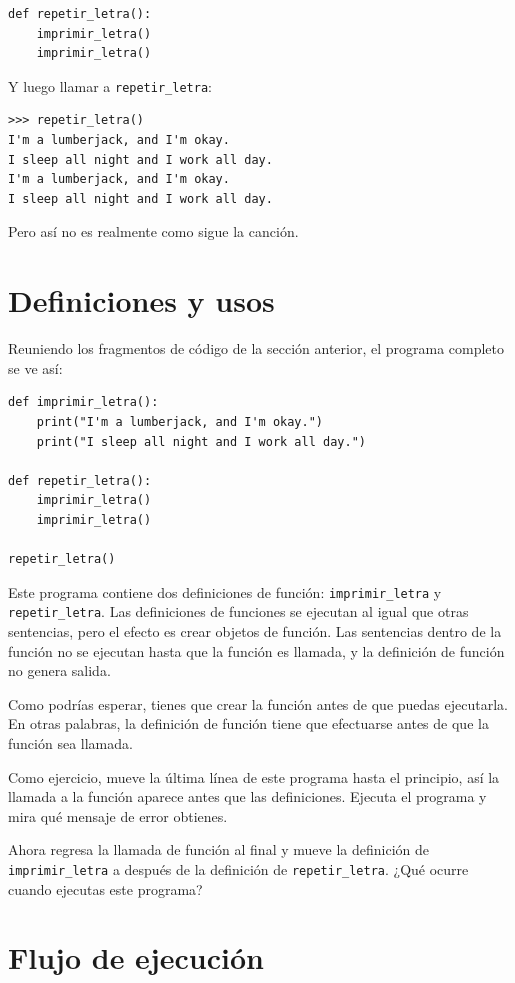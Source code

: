 \documentclass[10pt]{book}
\begin{document}
\begin{verbatim}
def repetir_letra():
    imprimir_letra()
    imprimir_letra()
\end{verbatim}
%
Y luego llamar a \verb"repetir_letra":

\begin{verbatim}
>>> repetir_letra()
I'm a lumberjack, and I'm okay.
I sleep all night and I work all day.
I'm a lumberjack, and I'm okay.
I sleep all night and I work all day.
\end{verbatim}
%
Pero así no es realmente como sigue la canción.


\section{Definiciones y usos}

Reuniendo los fragmentos de código de la sección anterior, el
programa completo se ve así:

\begin{verbatim}
def imprimir_letra():
    print("I'm a lumberjack, and I'm okay.")
    print("I sleep all night and I work all day.")

def repetir_letra():
    imprimir_letra()
    imprimir_letra()

repetir_letra()
\end{verbatim}
%
Este programa contiene dos definiciones de función: \verb"imprimir_letra" y
\verb"repetir_letra".  Las definiciones de funciones se ejecutan al igual que otras
sentencias, pero el efecto es crear objetos de función.  Las sentencias
dentro de la función no se ejecutan hasta que la función es llamada, y
la definición de función no genera salida.

Como podrías esperar, tienes que crear la función antes de que puedas
ejecutarla.  En otras palabras, la definición de función tiene que efectuarse
antes de que la función sea llamada.

Como ejercicio, mueve la última línea de este programa
hasta el principio, así la llamada a la función aparece antes que las definiciones. Ejecuta
el programa y mira qué mensaje
de error obtienes.

Ahora regresa la llamada de función al final
y mueve la definición de \verb"imprimir_letra" a después de la definición de
\verb"repetir_letra".  ¿Qué ocurre cuando ejecutas este programa?


\section{Flujo de ejecución}
\end{document}
